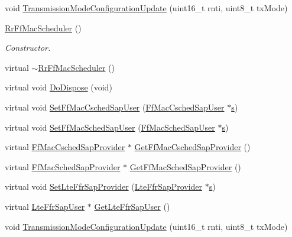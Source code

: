 \begin{DoxyCompactItemize}
\item 
void \hyperlink{classns3_1_1RrFfMacScheduler_ab676b4e13fbf1b6d4d7e22fb43663931}{Transmission\+Mode\+Configuration\+Update} (uint16\+\_\+t rnti, uint8\+\_\+t tx\+Mode)
\item 
\hyperlink{classns3_1_1RrFfMacScheduler_a20d105a158cad76a4189163619a08147}{Rr\+Ff\+Mac\+Scheduler} ()
\begin{DoxyCompactList}\small\item\em Constructor. \end{DoxyCompactList}\item 
virtual \hyperlink{classns3_1_1RrFfMacScheduler_ae59bddabc0a50995c4ebfbc44b6c0d33}{$\sim$\+Rr\+Ff\+Mac\+Scheduler} ()
\item 
virtual void \hyperlink{classns3_1_1RrFfMacScheduler_ac4ac632aaa4a969f663b4ca85ac1debc}{Do\+Dispose} (void)
\item 
virtual void \hyperlink{classns3_1_1RrFfMacScheduler_a4a091fed16611d589c536ce2d7379136}{Set\+Ff\+Mac\+Csched\+Sap\+User} (\hyperlink{classns3_1_1FfMacCschedSapUser}{Ff\+Mac\+Csched\+Sap\+User} $\ast$\hyperlink{generate__test__data__lte__sinr_8m_ad83eeb3a142285d1243a08c6b7026df8}{s})
\item 
virtual void \hyperlink{classns3_1_1RrFfMacScheduler_aeab6d8973513f6c6e7aa9c0f4a436b9c}{Set\+Ff\+Mac\+Sched\+Sap\+User} (\hyperlink{classns3_1_1FfMacSchedSapUser}{Ff\+Mac\+Sched\+Sap\+User} $\ast$\hyperlink{generate__test__data__lte__sinr_8m_ad83eeb3a142285d1243a08c6b7026df8}{s})
\item 
virtual \hyperlink{classns3_1_1FfMacCschedSapProvider}{Ff\+Mac\+Csched\+Sap\+Provider} $\ast$ \hyperlink{classns3_1_1RrFfMacScheduler_a6aac9c8d0f1bbf75cf2ccb6eb05f5dc2}{Get\+Ff\+Mac\+Csched\+Sap\+Provider} ()
\item 
virtual \hyperlink{classns3_1_1FfMacSchedSapProvider}{Ff\+Mac\+Sched\+Sap\+Provider} $\ast$ \hyperlink{classns3_1_1RrFfMacScheduler_a70014d72689a5b2c2ca0b565f2665925}{Get\+Ff\+Mac\+Sched\+Sap\+Provider} ()
\item 
virtual void \hyperlink{classns3_1_1RrFfMacScheduler_a57634c71b6bd4827363f433bfe74fcdb}{Set\+Lte\+Ffr\+Sap\+Provider} (\hyperlink{classns3_1_1LteFfrSapProvider}{Lte\+Ffr\+Sap\+Provider} $\ast$\hyperlink{generate__test__data__lte__sinr_8m_ad83eeb3a142285d1243a08c6b7026df8}{s})
\item 
virtual \hyperlink{classns3_1_1LteFfrSapUser}{Lte\+Ffr\+Sap\+User} $\ast$ \hyperlink{classns3_1_1RrFfMacScheduler_a0c06e8214189443909d55f660b0c0c77}{Get\+Lte\+Ffr\+Sap\+User} ()
\item 
void \hyperlink{classns3_1_1RrFfMacScheduler_ab676b4e13fbf1b6d4d7e22fb43663931}{Transmission\+Mode\+Configuration\+Update} (uint16\+\_\+t rnti, uint8\+\_\+t tx\+Mode)
\end{DoxyCompactItemize}
